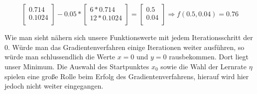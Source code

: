 \begin{align*}
    \\\\
    \begin{bmatrix}
      0.714\\
      0.1024\\
    \end{bmatrix} - 0.05 * \begin{bmatrix}
      6 * 0.714\\
      12 * 0.1024\\
    \end{bmatrix} = \begin{bmatrix}
      0.5\\
      0.04\\
    \end{bmatrix} \Rightarrow f(0.5, 0.04) = 0.76
    \\\\
  \end{align*}
  Wie man sieht nähern sich unsere Funktionswerte mit jedem Iterationsschritt
  der 0. Würde man das Gradientenverfahren einige Iterationen weiter ausführen, so 
  würde man schlussendlich die Werte $x = 0$ und $y = 0$ rausbekommen. Dort liegt unser Minimum.
  \bigbreak\noindent
  Die Auswahl des Startpunktes $x_{0}$ sowie die Wahl der Lernrate $\eta$ spielen eine große Rolle beim Erfolg des
  Gradientenverfahrens, hierauf wird hier jedoch nicht weiter eingegangen.
\iffalse
